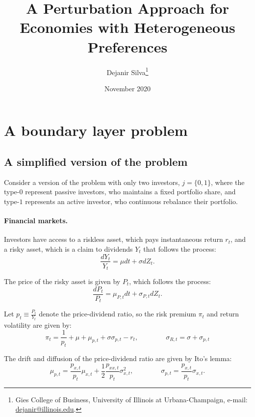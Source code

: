 \documentclass[11pt,english]{article}
\title{\textbf{A Perturbation Approach for Economies with Heterogeneous Preferences}}
\author{ Dejanir Silva\thanks{Gies College of Business, University of Illinois at Urbana-Champaign, e-mail: \href{dejanir@illinois.edu}{dejanir@illinois.edu}.}}
\date{November 2020}
\begin{document}
\onehalfspacing	

\section{A boundary layer problem}

\subsection{A simplified version of the problem}

Consider a version of the problem with only two investors, $j = \{0,1\}$, where the type-$0$ represent passive investors, who maintains a fixed portfolio share, and type-$1$ represents an active investor, who continuous rebalance their portfolio.

\paragraph{Financial markets.} Investors have access to a riskless asset, which pays instantaneous return $r_t$, and a risky asset, which is a claim to dividends $Y_t$ that follows the process:
\begin{equation}
    \frac{d Y_t}{Y_t} = \mu dt + \sigma d Z_t.
\end{equation}

The price of the risky asset is given by $P_t$, which follows the process:
\begin{equation}
    \frac{d P_{t}}{P_t} = \mu_{P,t} dt + \sigma_{P,t} dZ_t.
\end{equation}

Let $p_t \equiv \frac{P_t}{Y_t}$ denote the price-dividend ratio, so the risk premium $\pi_t$ and return volatility are given by:
\begin{equation}
    \pi_t = \frac{1}{p_t} + \mu+\mu_{p,t} + \sigma \sigma_{p,t}  - r_t, \qquad \qquad
    \sigma_{R,t} = \sigma +\sigma_{p,t}
\end{equation}

The drift and diffusion of the price-dividend ratio are given by Ito's lemma:
\begin{equation}
    \mu_{p,t} =  \frac{p_{x,t}}{p_t} \mu_{x,t}+\frac{1}{2} \frac{p_{xx,t}}{p_t} \sigma_{x,t}^2, \qquad \qquad
    \sigma_{p,t} = \frac{p_{x,t}}{p_t} \sigma_{x,t}.
\end{equation}
\end{document}
